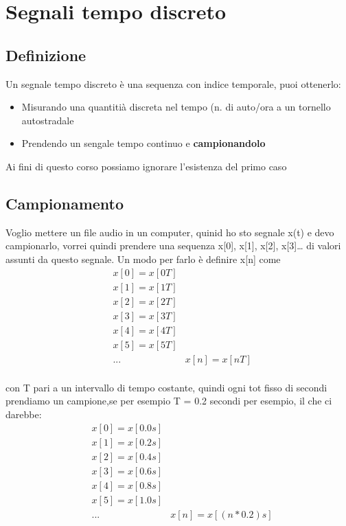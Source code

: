 \documentclass[11pt]{article}
\date{\today}
\title{}
\begin{document}
\tableofcontents

\section{Segnali tempo discreto}
\label{sec:org8f3b7ba}

\subsection{Definizione}
\label{sec:org2428fab}
Un segnale tempo discreto è una sequenza con indice temporale, puoi
ottenerlo:
\begin{itemize}
\item Misurando una quantitià discreta nel tempo (n. di auto/ora
a un tornello autostradale
\item Prendendo un sengale tempo continuo e \textbf{campionandolo}
\end{itemize}

Ai fini di questo corso possiamo ignorare l'esistenza del primo caso

\subsection{Campionamento}
\label{sec:org63301ee}

Voglio mettere un file audio in un computer, quinid ho sto segnale
x(t) e devo campionarlo, vorrei quindi prendere una sequenza x[0],
x[1], x[2], x[3]\ldots{} di valori assunti da questo segnale. Un modo per
farlo è definire x[n] come
\begin{align*}
&x[0] = x[0T] \\
&x[1] = x[1T] \\
&x[2] = x[2T] \\
&x[3] = x[3T] \\
&x[4] = x[4T] \\
&x[5] = x[5T] \\
&... 
&x[n] = x[nT] \\
\end{align*}

con T pari a un intervallo di tempo costante, quindi ogni tot fisso di
secondi prendiamo un campione,se per esempio T = 0.2 secondi per
esempio, il che ci darebbe:
\begin{align*}
&x[0] = x[0.0s] \\
&x[1] = x[0.2s] \\
&x[2] = x[0.4s] \\
&x[3] = x[0.6s] \\
&x[4] = x[0.8s] \\
&x[5] = x[1.0s] \\
&... 
&x[n] = x[(n*0.2)s] \\
\end{align*}
\end{document}
